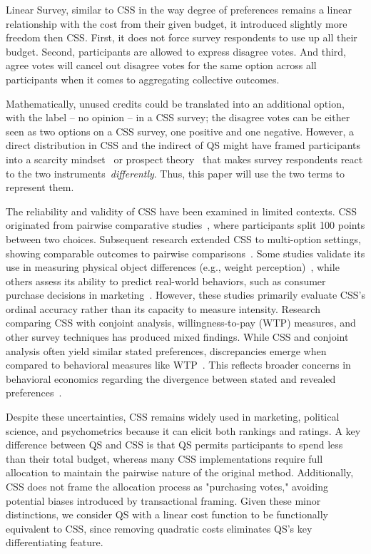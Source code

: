Linear Survey, similar to CSS in the way degree of preferences remains a linear relationship with the cost from their given budget, it introduced slightly more freedom then CSS. First, it does not force survey respondents to use up all their budget. Second, participants are allowed to express disagree votes. And third, agree votes will cancel out disagree votes for the same option across all participants when it comes to aggregating collective outcomes.

Mathematically, unused credits could be translated into an additional option, with the label -- no opinion -- in a CSS survey; the disagree votes can be either seen as two options on a CSS survey, one positive and one negative. However, a direct distribution in CSS and the indirect of QS might have framed participants into a scarcity mindset~\cite{shahScarcityFramesValue2015} or prospect theory~\cite{kahnemanProspectTheoryAnalysis1979} that makes survey respondents react to the two instruments~\textit{differently}. Thus, this paper will use the two terms to represent them.

The reliability and validity of CSS have been examined in limited contexts. CSS originated from pairwise comparative studies~\cite{metfesselProposalQuantitativeReporting1947}, where participants split 100 points between two choices. Subsequent research extended CSS to multi-option settings, showing comparable outcomes to pairwise comparisons~\cite{collewetPreferenceEstimationPoint2023}.  Some studies validate its use in measuring physical object differences (e.g., weight perception)~\cite{dudekValidityPointAssignmentProcedure1957}, while others assess its ability to predict real-world behaviors, such as consumer purchase decisions in marketing~\cite{collewetPreferenceEstimationPoint2023}. However, these studies primarily evaluate CSS’s ordinal accuracy rather than its capacity to measure intensity. Research comparing CSS with conjoint analysis, willingness-to-pay (WTP) measures, and other survey techniques has produced mixed findings. While CSS and conjoint analysis often yield similar stated preferences, discrepancies emerge when compared to behavioral measures like WTP~\cite{louviereComparisonImportanceWeights2008}. This reflects broader concerns in behavioral economics regarding the divergence between stated and revealed preferences~\cite{collewetPreferenceEstimationPoint2023, louviereComparisonImportanceWeights2008}.

Despite these uncertainties, CSS remains widely used in marketing, political science, and psychometrics because it can elicit both rankings and ratings. A key difference between QS and CSS is that QS permits participants to spend less than their total budget, whereas many CSS implementations require full allocation to maintain the pairwise nature of the original method. Additionally, CSS does not frame the allocation process as "purchasing votes," avoiding potential biases introduced by transactional framing. Given these minor distinctions, we consider QS with a linear cost function to be functionally equivalent to CSS, since removing quadratic costs eliminates QS’s key differentiating feature.
